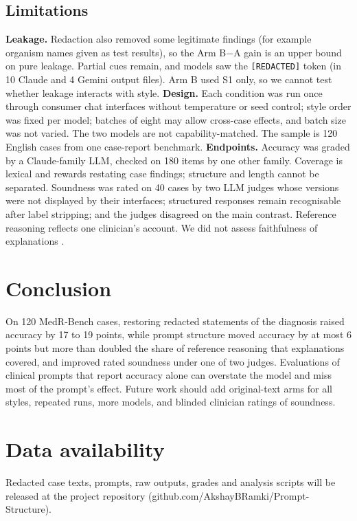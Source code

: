 \IfFileExists{IEEEtran.cls}{\ieeetrue\documentclass[conference]{IEEEtran}}{\ieeefalse\documentclass[10pt,twocolumn,letterpaper]{article}}
\begin{document}
\subsection{Limitations}
\textbf{Leakage.} Redaction also removed some legitimate findings (for example organism names given as test results), so the Arm B$-$A gain is an upper bound on pure leakage. Partial cues remain, and models saw the \texttt{[REDACTED]} token (in 10 Claude and 4 Gemini output files). Arm B used S1 only, so we cannot test whether leakage interacts with style.
\textbf{Design.} Each condition was run once through consumer chat interfaces without temperature or seed control; style order was fixed per model; batches of eight may allow cross-case effects, and batch size was not varied. The two models are not capability-matched. The sample is 120 English cases from one case-report benchmark.
\textbf{Endpoints.} Accuracy was graded by a Claude-family LLM, checked on 180 items by one other family. Coverage is lexical and rewards restating case findings; structure and length cannot be separated. Soundness was rated on 40 cases by two LLM judges whose versions were not displayed by their interfaces; structured responses remain recognisable after label stripping; and the judges disagreed on the main contrast. %
Reference reasoning reflects one clinician's account. We did not assess faithfulness of explanations \cite{turpin2023}.

\section{Conclusion}
On 120 MedR-Bench cases, restoring redacted statements of the diagnosis raised accuracy by 17 to 19 points, while prompt structure moved accuracy by at most 6 points but more than doubled the share of reference reasoning that explanations covered, and improved rated soundness under one of two judges. Evaluations of clinical prompts that report accuracy alone can overstate the model and miss most of the prompt's effect. Future work should add original-text arms for all styles, repeated runs, more models, and blinded clinician ratings of soundness.

\ifanon\else
\section*{Data availability}
Redacted case texts, prompts, raw outputs, grades and analysis scripts will be released at the project repository (github.com/AkshayBRamki/Prompt-Structure).
\fi
\end{document}
